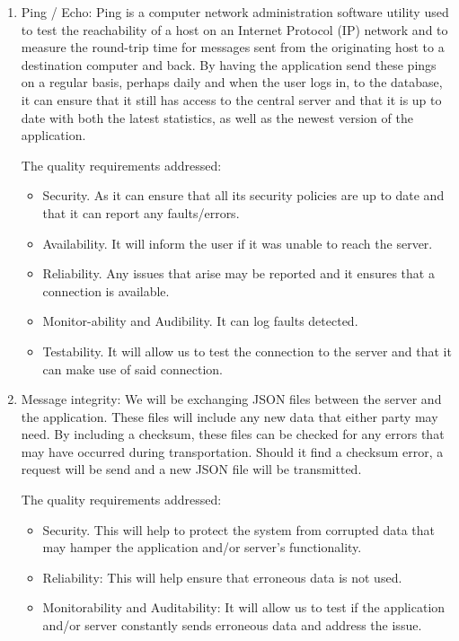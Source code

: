 \documentclass[hidelinks,a4paper,12pt]{article}
\begin{document}
\begin{enumerate}
		\item Ping / Echo:
		Ping is a computer network administration software utility used to test the reachability of a host on an Internet Protocol (IP) network and to measure the round-trip time for messages sent from the originating host to a destination computer and back. By having the application send these pings on a regular basis, perhaps daily and when the user logs in, to the database, it can ensure that it still has access to the central server and that it is up to date with both the latest statistics, as well as the newest version of the application.

		The quality requirements addressed:
		\begin{itemize}
			\item Security. As it can ensure that all its security policies are up to date and that it can report any faults/errors.
			\item Availability. It will inform the user if it was unable to reach the server.
			\item Reliability. Any issues that arise may be reported and it ensures that a connection is available.
			\item Monitor-ability and Audibility. It can log faults detected.
			\item Testability. It will allow us to test the connection to the server and that it can make use of said connection.
		\end{itemize}
		
		\item Message integrity:
		We will be exchanging JSON files between the server and the application. These files will include any new data that either party may need. By including a checksum, these files can be checked for any errors that may have occurred during transportation. Should it find a checksum error, a request will be send and a new JSON file will be transmitted.

		The quality requirements addressed:
		\begin{itemize}
			\item Security. This will help to protect the system from corrupted data that may hamper the application and/or server's functionality.
			\item Reliability: This will help ensure that erroneous data is not used.
			\item Monitorability and Auditability: It will allow us to test if the application and/or server constantly sends erroneous data and address the issue.
		\end{itemize}
		

\end{enumerate}
\end{document}
